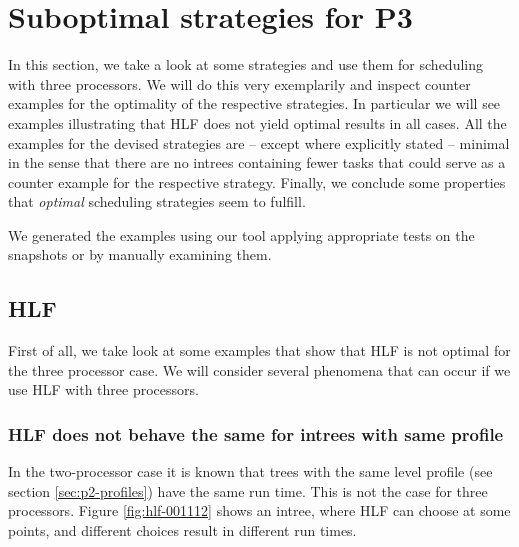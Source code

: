 \chapter{Suboptimal strategies for P3}
\label{chap:p3-suboptimal}

In this section, we take a look at some strategies and use them for scheduling with three processors. We will do this very exemplarily and inspect counter examples for the optimality of the respective strategies. In particular we will see examples illustrating that HLF does not yield optimal results in all cases. All the examples for the devised strategies are -- except where explicitly stated -- minimal in the sense that there are no intrees containing fewer tasks that could serve as a counter example for the respective strategy.
Finally, we conclude some properties that \emph{optimal} scheduling strategies seem to fulfill.

We generated the examples using our tool applying appropriate tests on the snapshots or by manually examining them.

\section{HLF}
\label{sec:hlf-p3-suboptimal}

First of all, we take look at some examples that show that HLF is not optimal for the three processor case. We will consider several phenomena that can occur if we use HLF with three processors.

\subsection{HLF does not behave the same for intrees with same profile}
\label{sec:p3-suboptimal-hlf-same-profiles-different-run-times}

In the two-processor case it is known that trees with the same level profile (see section \ref{sec:p2-profiles}) have the same run time. This is not the case for three processors. Figure \ref{fig:hlf-001112} shows an intree, where HLF can choose at some points, and different choices result in different run times.

